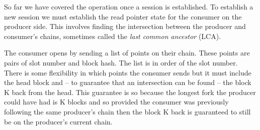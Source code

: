 \documentclass{article}
\theoremstyle{definition}{
  \newtheorem{lemma}{Lemma}[section] %
  \newtheorem{definition}[lemma]{Definition}
}
\theoremstyle{theorem}{
  \newtheorem{invariant}[lemma]{Invariant}
  \newtheorem{proofobligation}[lemma]{Proof Obligation}
}
\numberwithin{equation}{lemma}
\begin{document}
So far we have covered the operation once a session is established. To
establish a new session we must establish the read pointer state for the
consumer on the producer side. This involves finding the intersection between
the producer and consumer's chains, sometimes called the \emph{last common
ancestor} (LCA).

The consumer opens by sending a list of points on their chain. These points
are pairs of slot number and block hash. The list is in order of the slot
number. There is some flexibility in which points the consumer sends but it
must include the head block and -- to guarantee that an intersection can be
found -- the block K back from the head. This guarantee is so because the
longest fork the producer could have had is K blocks and so provided the
consumer was previously following the same producer's chain then the block K
back is guaranteed to still be on the producer's current chain.
\end{document}
